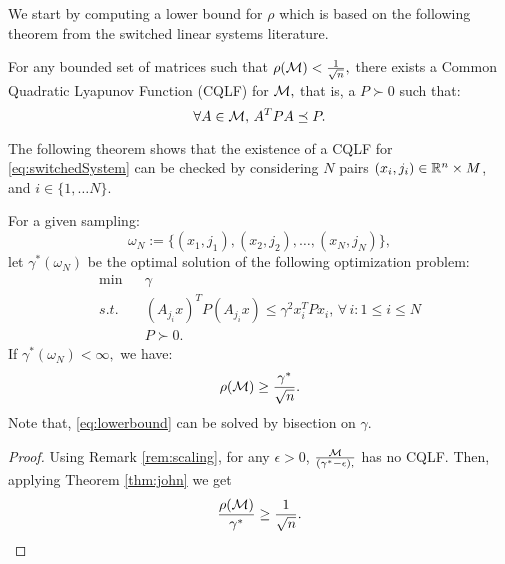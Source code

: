 We start by computing a lower bound for $\rho$ which is based on the following theorem from the switched linear systems literature.

\begin{theorem}\cite[Theorem 2.11]{jungers_lncis}\label{thm:john}
For any bounded set of matrices such that $\rho(\mathcal{M})<\frac{1}{\sqrt{n}},$ there exists a Common Quadratic Lyapunov Function (CQLF) for $\mathcal{M},$ that is, a $P\succ 0$ such that: $$\forall A\in \mathcal{M},\, A^TPA\preceq P. $$
\end{theorem}

The following theorem shows that the existence of a CQLF for \eqref{eq:switchedSystem} can be checked by considering $N$ pairs $(x_i, j_i) \in \mathbb{R}^n \times M$, and $i \in \{1, \ldots N\}.$%
%

\begin{theorem}
For a given sampling: $$\omega_N := \{(x_1, j_1), (x_2, j_2), \ldots, (x_N, j_N)\},$$ let $\gamma^*(\omega_N)$ be the optimal solution of the following optimization problem:
\begin{eqnarray}
\nonumber \mbox{min}&&\gamma\\
 s.t.& & \label{eq:lowerbound}(A_{j_i}x)^T P (A_{j_i}x) \leq \gamma^2 x_i^TPx_i,\,  \forall \,i :1\leq i \leq N\\
\nonumber && P \succ 0.
\end{eqnarray}
If $\gamma^*(\omega_N)<\infty,$ we have:
$$\rho(\mathcal{M}) \geq \frac{\gamma^*}{\sqrt{n}}.$$ Note that, \eqref{eq:lowerbound} can be solved by bisection on $\gamma$.

\end{theorem}
\begin{proof}
Using Remark \ref{rem:scaling}, for any $\epsilon > 0$, $\frac{\mathcal{M}}{(\gamma^*-\epsilon),}$ has no CQLF. Then, applying Theorem \ref{thm:john} we get
\begin{equation*}\frac{\rho(\mathcal{M})}{\gamma^*} \geq \frac{1}{\sqrt{n}}.\end{equation*}
\end{proof}